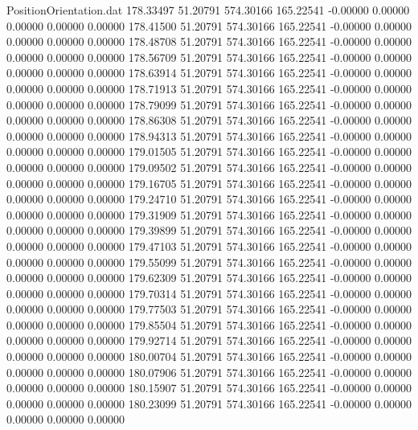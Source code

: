 \begin{filecontents}{PositionOrientation.dat}
 178.33497   51.20791  574.30166   165.22541   -0.00000    0.00000    0.00000    0.00000    0.00000
 178.41500   51.20791  574.30166   165.22541   -0.00000    0.00000    0.00000    0.00000    0.00000
 178.48708   51.20791  574.30166   165.22541   -0.00000    0.00000    0.00000    0.00000    0.00000
 178.56709   51.20791  574.30166   165.22541   -0.00000    0.00000    0.00000    0.00000    0.00000
 178.63914   51.20791  574.30166   165.22541   -0.00000    0.00000    0.00000    0.00000    0.00000
 178.71913   51.20791  574.30166   165.22541   -0.00000    0.00000    0.00000    0.00000    0.00000
 178.79099   51.20791  574.30166   165.22541   -0.00000    0.00000    0.00000    0.00000    0.00000
 178.86308   51.20791  574.30166   165.22541   -0.00000    0.00000    0.00000    0.00000    0.00000
 178.94313   51.20791  574.30166   165.22541   -0.00000    0.00000    0.00000    0.00000    0.00000
 179.01505   51.20791  574.30166   165.22541   -0.00000    0.00000    0.00000    0.00000    0.00000
 179.09502   51.20791  574.30166   165.22541   -0.00000    0.00000    0.00000    0.00000    0.00000
 179.16705   51.20791  574.30166   165.22541   -0.00000    0.00000    0.00000    0.00000    0.00000
 179.24710   51.20791  574.30166   165.22541   -0.00000    0.00000    0.00000    0.00000    0.00000
 179.31909   51.20791  574.30166   165.22541   -0.00000    0.00000    0.00000    0.00000    0.00000
 179.39899   51.20791  574.30166   165.22541   -0.00000    0.00000    0.00000    0.00000    0.00000
 179.47103   51.20791  574.30166   165.22541   -0.00000    0.00000    0.00000    0.00000    0.00000
 179.55099   51.20791  574.30166   165.22541   -0.00000    0.00000    0.00000    0.00000    0.00000
 179.62309   51.20791  574.30166   165.22541   -0.00000    0.00000    0.00000    0.00000    0.00000
 179.70314   51.20791  574.30166   165.22541   -0.00000    0.00000    0.00000    0.00000    0.00000
 179.77503   51.20791  574.30166   165.22541   -0.00000    0.00000    0.00000    0.00000    0.00000
 179.85504   51.20791  574.30166   165.22541   -0.00000    0.00000    0.00000    0.00000    0.00000
 179.92714   51.20791  574.30166   165.22541   -0.00000    0.00000    0.00000    0.00000    0.00000
 180.00704   51.20791  574.30166   165.22541   -0.00000    0.00000    0.00000    0.00000    0.00000
 180.07906   51.20791  574.30166   165.22541   -0.00000    0.00000    0.00000    0.00000    0.00000
 180.15907   51.20791  574.30166   165.22541   -0.00000    0.00000    0.00000    0.00000    0.00000
 180.23099   51.20791  574.30166   165.22541   -0.00000    0.00000    0.00000    0.00000    0.00000

\end{filecontents}
